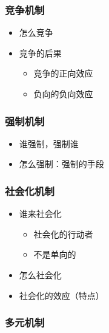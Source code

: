 \documentclass[
  12pt,
]{ctexart}
\begin{document}
\hypertarget{ux7adeux4e89ux673aux5236}{%
\subsubsection{竞争机制}\label{ux7adeux4e89ux673aux5236}}

\begin{itemize}
\item
  怎么竞争
\item
  竞争的后果

  \begin{itemize}
  \item
    竞争的正向效应
  \item
    负向的负向效应
  \end{itemize}
\end{itemize}

\hypertarget{ux5f3aux5236ux673aux5236}{%
\subsubsection{强制机制}\label{ux5f3aux5236ux673aux5236}}

\begin{itemize}
\item
  谁强制，强制谁
\item
  怎么强制：强制的手段
\end{itemize}

\hypertarget{ux793eux4f1aux5316ux673aux5236}{%
\subsubsection{社会化机制}\label{ux793eux4f1aux5316ux673aux5236}}

\begin{itemize}
\item
  谁来社会化

  \begin{itemize}
  \item
    社会化的行动者
  \item
    不是单向的
  \end{itemize}
\item
  怎么社会化
\item
  社会化的效应（特点）
\end{itemize}

\hypertarget{ux591aux5143ux673aux5236}{%
\subsubsection{多元机制}\label{ux591aux5143ux673aux5236}}
\end{document}
